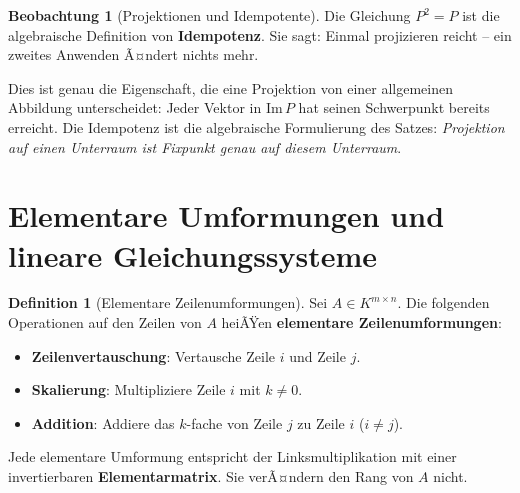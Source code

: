 ﻿\documentclass[a4paper,12pt]{report}
\theoremstyle{definition}
\newtheorem{definition}{Definition}
\newtheorem{beobachtung}{Beobachtung}
\begin{document}
\begin{beobachtung}[Projektionen und Idempotente]
    Die Gleichung $P^2 = P$ ist die algebraische Definition von
    \textbf{Idempotenz}. Sie sagt: Einmal projizieren reicht --
    ein zweites Anwenden Ã¤ndert nichts mehr.

    Dies ist genau die Eigenschaft, die eine Projektion von einer
    allgemeinen Abbildung unterscheidet: Jeder Vektor in $\mathrm{Im}\, P$
    hat seinen Schwerpunkt bereits erreicht. Die Idempotenz ist die
    algebraische Formulierung des Satzes: \emph{Projektion auf einen
    Unterraum ist Fixpunkt genau auf diesem Unterraum}.
\end{beobachtung}

\section{Elementare Umformungen und lineare Gleichungs\-systeme}

\begin{definition}[Elementare Zeilenumformungen]
    Sei $A \in K^{m \times n}$. Die folgenden Operationen auf den Zeilen
    von $A$ heiÃŸen \textbf{elementare Zeilenumformungen}:
    \begin{itemize}
        \item[-] \textbf{Zeilenvertauschung}: Vertausche Zeile $i$ und Zeile $j$.
        \item[-] \textbf{Skalierung}: Multipliziere Zeile $i$ mit $k \neq 0$.
        \item[-] \textbf{Addition}: Addiere das $k$-fache von Zeile $j$ zu Zeile $i$ ($i \neq j$).
    \end{itemize}
    Jede elementare Umformung entspricht der Linksmultiplikation mit einer
    invertierbaren \textbf{Elementarmatrix}. Sie verÃ¤ndern den Rang von $A$
    nicht.
\end{definition}
\end{document}
